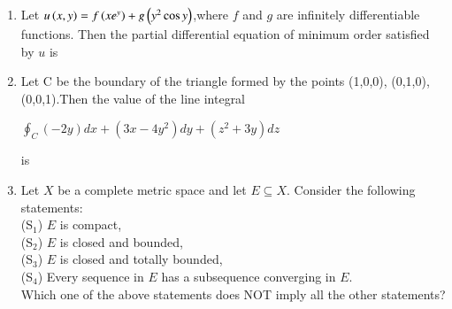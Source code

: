 \documentclass[journal]{IEEEtran}
\begin{document}
\begin{enumerate}
\begin{enumerate}
\end{enumerate}
\item Let $u\left(x, y\right) = f\left(xe^y\right) + g\left(y^2 \cos y\right)$,where $f$ and $g$ are infinitely differentiable functions. Then the partial differential equation of minimum order satisfied by $u$ is
\begin{enumerate}
\end{enumerate}
\item Let  C  be the boundary of the triangle formed by the points  (1,0,0), (0,1,0), (0,0,1).Then the value of the line integral  \begin{center} $ \oint_C (-2y)dx + (3x-4y^2)dy + (z^2+3y)dz $ \end{center} is
\begin{enumerate}
\end{enumerate}
\item Let $X$ be a complete metric space and let $E \subseteq X$. Consider the following statements: \\
(S$_1$) $E$ is compact, \\
(S$_2$) $E$ is closed and bounded, \\
(S$_3$) $E$ is closed and totally bounded, \\
(S$_4$) Every sequence in $E$ has a subsequence converging in $E$. \\
Which one of the above statements does NOT imply all the other statements?  
\begin{enumerate}
\begin{multicols}{2}

\end{multicols}
\end{enumerate}
\end{enumerate}
\end{document}
